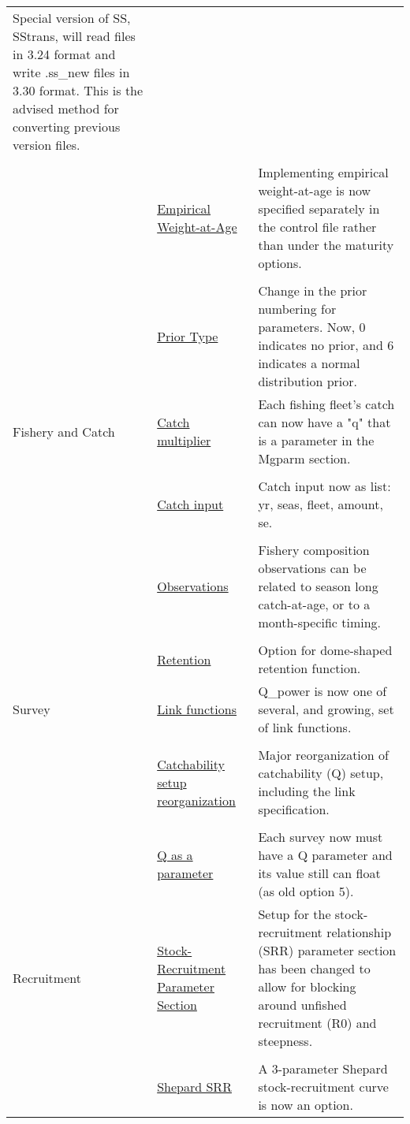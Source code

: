 \documentclass[12pt]{article}
\begin{document}
\begin{center}
\begin{longtable}{p{2cm} p{3cm} p{10cm}}
		Special version of SS, SStrans, will read files in 3.24 format and write .ss\_new files in 3.30 format.  This is the advised method for converting previous version files.\\
		\\
		& \hyperlink{WAAparm} {Empirical Weight-at-Age} & Implementing empirical weight-at-age is now specified separately in the control file rather than under the maturity options.\\
		\\
		& \hyperlink{Priors}{Prior Type} & Change in the prior numbering for parameters.  Now, 0 indicates no prior, and 6 indicates a normal distribution prior.\\
		\hline
		Fishery and Catch & 
		\hyperlink{CatchMult}{Catch multiplier} & 
		Each fishing fleet's catch can now have a "q" that is a parameter in the Mgparm section.\\
		\\						
		& \hyperlink{CatchFormat}{Catch input} & 
		Catch input now as list:  yr, seas, fleet, amount, se. \\
		\\						
		& \hyperlink{CompTiming}{Observations} & 
		Fishery composition observations can be related to season long catch-at-age, or to a month-specific timing.\\
		\\					
		& \hyperlink{DomeRetention}{Retention} & 
		Option for dome-shaped retention function. \\
		\hline
		Survey  
		& \hyperlink{Qsetup}{Link functions} & 
		Q\_power is now one of several, and growing, set of link functions. \\
		\\						
		& \hyperlink{Qsetup}{Catchability setup reorganization} & 
		Major reorganization of catchability (Q) setup, including the link specification. \\
		\\					
		& \multicolumn{1}{l}{\hyperlink{Qsetup}{Q as a parameter}} & 
		Each survey now must have a Q parameter and its value still can float (as old option 5).\\
		\hline
		Recruitment
		& \hyperlink{SRR}{Stock-Recruitment Parameter Section} & Setup for the stock-recruitment relationship (SRR) parameter section has been changed to allow for blocking around unfished recruitment (R0) and steepness.\\ 
		\\
		& \hyperlink{Shepard}{Shepard SRR} & 
		A 3-parameter Shepard stock-recruitment curve is now an option.\\

\end{longtable}
\end{center}
\end{document}
